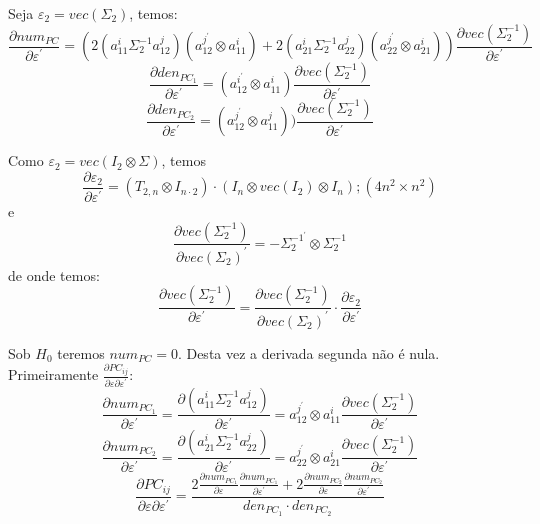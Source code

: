 \documentclass[a4paper,10pt]{article}
\begin{document}
Seja $\varepsilon_{2} = vec(\Sigma_{2})$, temos:
\begin{equation}
\frac{\partial num_{PC}}{\partial \varepsilon^{'}} = (2 (a_{11}^{i} \Sigma_{2}^{-1} a_{12}^{j}) (a_{12}^{j^{'}} \otimes a_{11}^{i}) +
2 (a_{21}^{i} \Sigma_{2}^{-1} a_{22}^{j}) (a_{22}^{j^{'}} \otimes a_{21}^{i}) )
\frac{\partial vec(\Sigma_{2}^{-1})}{\partial \varepsilon^{'}}
\end{equation}
\begin{equation}
\frac{\partial den_{PC_{1}}}{\partial \varepsilon^{'}} = (a_{12}^{i^{'}} \otimes a_{11}^{i}) 
\frac{\partial vec(\Sigma_{2}^{-1})}{\partial \varepsilon^{'}}
\end{equation}
\begin{equation}
\frac{\partial den_{PC_{2}}}{\partial \varepsilon^{'}} = (a_{12}^{j^{'}} \otimes a_{11}^{j}) )
\frac{\partial vec(\Sigma_{2}^{-1})}{\partial \varepsilon^{'}}
\end{equation}

Como $\varepsilon_{2} = vec(I_{2} \otimes \Sigma)$, temos
\begin{equation}
\frac{\partial \varepsilon_{2}}{\partial \varepsilon^{'}} = (T_{2,n} \otimes I_{n \cdot 2}) \cdot (I_{n} \otimes vec(I_{2}) \otimes I_{n}); (4n^{2} \times n^{2})
\end{equation}
e
\begin{equation}
\frac{\partial vec(\Sigma_{2}^{-1})}{\partial vec(\Sigma_{2})^{'}} = -\Sigma_{2}^{-1^{'}} \otimes \Sigma_{2}^{-1}
\end{equation}
de onde temos:
\begin{equation}
\frac{\partial vec(\Sigma_{2}^{-1})}{\partial \varepsilon^{'}} = \frac{\partial vec(\Sigma_{2}^{-1})}{\partial vec(\Sigma_{2})^{'}} \cdot \frac{\partial \varepsilon_{2}}{\partial \varepsilon^{'}}
\end{equation}

Sob $H_0$ teremos $num_{PC} = 0$. Desta vez a derivada segunda não é nula. Primeiramente $\frac{\partial PC_{ij}}{\partial \varepsilon \partial \varepsilon^{'}}$:
\begin{equation}
\frac{\partial num_{PC_{1}}}{\partial \varepsilon^{'}} = \frac{\partial (a_{11}^{i} \Sigma_{2}^{-1} a_{12}^{j})}{\partial \varepsilon^{'}} = a_{12}^{j^{'}} \otimes a_{11}^{i} \frac{\partial vec(\Sigma_{2}^{-1})}{\partial \varepsilon^{'}}
\end{equation}
\begin{equation}
\frac{\partial num_{PC_{2}}}{\partial \varepsilon^{'}} = \frac{\partial (a_{21}^{i} \Sigma_{2}^{-1} a_{22}^{j})}{\partial \varepsilon^{'}} = a_{22}^{j^{'}} \otimes a_{21}^{i} \frac{\partial vec(\Sigma_{2}^{-1})}{\partial \varepsilon^{'}}
\end{equation}
\begin{equation}
\frac{\partial PC_{ij}}{\partial \varepsilon \partial \varepsilon^{'}} = \frac{2 \frac{\partial num_{PC_{1}}}{\partial \varepsilon} \frac{\partial num_{PC_{1}}}{\partial \varepsilon^{'}} + 2 \frac{\partial num_{PC_{2}}}{\partial \varepsilon} \frac{\partial num_{PC_{2}}}{\partial \varepsilon^{'}}}{den_{PC_{1}} \cdot den_{PC_{2}}}
\end{equation}
\end{document}
